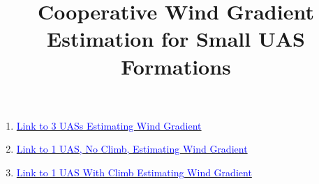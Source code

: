 \documentclass[conference]{IEEEtran}
\begin{document}
\title{Cooperative Wind Gradient Estimation for Small UAS Formations\\
}

\author{
}

\maketitle

\begin{enumerate}
    \item \href{https://youtu.be/I1R92603xzI}{{\textcolor{blue}{Link to 3 UASs Estimating Wind Gradient}}}
    \item \href{https://youtu.be/PB9hqby9TCI}{{\textcolor{blue}{Link to 1 UAS, No Climb, Estimating Wind Gradient}}}
    \item \href{https://youtu.be/ZCwqw6uvsHc}{{\textcolor{blue}{Link to 1 UAS With Climb Estimating Wind Gradient}}}
\end{enumerate}






\end{document}
